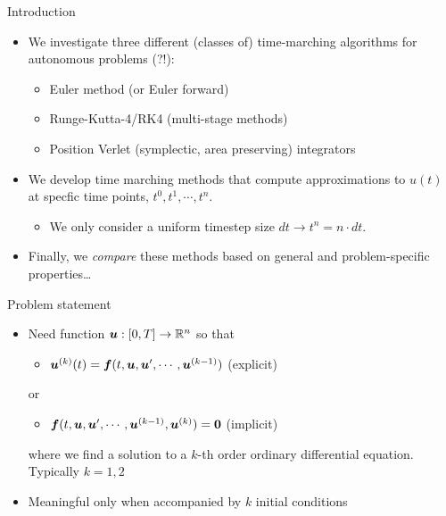 \documentclass[presentation]{beamer}
\newcommand{\gv}[1]{\ensuremath{\mbox{\boldmath$ #1 $}}}
\begin{document}
\begin{frame}[label={sec:org7c3d971}]{Introduction}
\begin{itemize}
\item We investigate three different (classes of) time-marching algorithms for
autonomous problems (?!):
\begin{itemize}
\item Euler method (or Euler forward)
\item Runge-Kutta-4/RK4 (multi-stage methods)
\item Position Verlet (symplectic, area preserving) integrators
\end{itemize}
\item We develop time marching methods that compute approximations to \(u(t)\)
at specfic time points, \(t^0, t^1, \cdots, t^n\).
\begin{itemize}
\item We only consider a uniform timestep size \(dt  \rightarrow t^n = n \cdot
       dt\).
\end{itemize}
\item Finally, we \emph{compare} these methods based on general and problem-specific properties\ldots{}
\end{itemize}
\end{frame}
\begin{frame}[label={sec:org3d4f28d}]{Problem statement}
\begin{itemize}
\item Need function \(\gv{u} : [0, T] \to \mathbb{R}^n\) so that
\begin{itemize}
\item \(\gv{u}^{(k)}(t) = \gv{f}(t, \gv{u}, \gv{u}', \cdots , \gv{u}^{(k-1)})\) (\alert{explicit})
\end{itemize}
or
\begin{itemize}
\item \(\gv{f}(t, \gv{u}, \gv{u}', \cdots , \gv{u}^{(k-1)}, \gv{u}^{(k)}) = \gv{0}\) (\alert{implicit})
\end{itemize}
where we find a solution to a \(k\)-th order ordinary differential
equation. Typically \(k = 1,2\)
\item Meaningful only when accompanied by \(k\) initial conditions
\end{itemize}
\end{frame}
\end{document}
